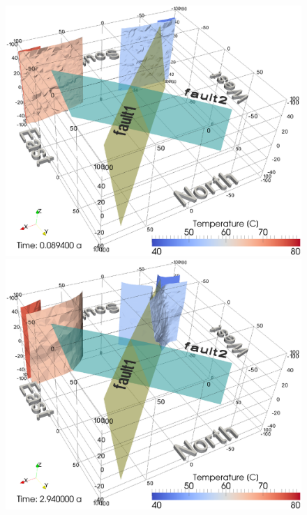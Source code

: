 \begin{figure}[htbp]
    \begin{center}
        \begin{minipage}{0.37\textwidth}
            \includegraphics[width=1\textwidth]{PART_II/T/2u2f_fig5a.eps}
        \end{minipage}
        \begin{minipage}{0.37\textwidth}
            \includegraphics[width=1\textwidth]{PART_II/T/2u2f_fig5b.eps}
        \end{minipage}

\end{center}
\end{figure}
